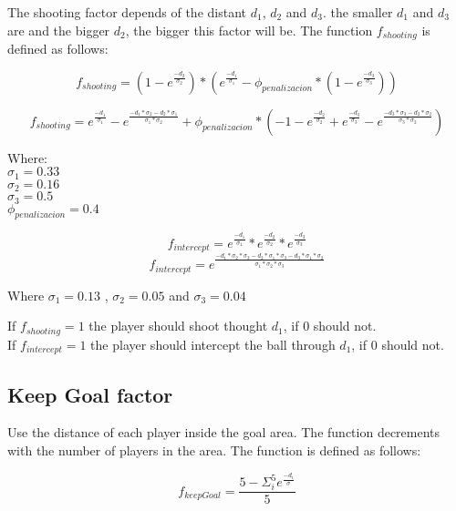 \documentclass[
10pt, %
a4paper, %
oneside, %
headinclude,footinclude, %
BCOR5mm, %
]{scrartcl}
\begin{document}
The shooting factor depends of the distant $d_1$, $d_2$ and $d_3$. the smaller $d_1$ and $d_3$ are and the bigger $d_2$, the bigger this factor will be. The function $f_{shooting}$ is defined as follows:

\begin{equation}	
			f_{shooting} = (1-e^{\frac{-d_2}{\sigma_2}})*(e^{\frac{-d_1}{\sigma_1}} - \phi_{penalizacion} *(1 - e^{\frac{-d_3}{\sigma_3}}))
\end{equation}


\begin{equation} 
	f_{shooting} = e^{\frac{-d_1}{\sigma_1}}- e^{\frac{-d_1*\sigma_2 - d_2*\sigma_1}{\sigma_1*\sigma_2}} + \phi_{penalizacion} * (-1 -e^{\frac{-d_2}{\sigma_2}} + e^{\frac{-d_3}{\sigma_3}} - e^{\frac{-d_3*\sigma_3 - d_2*\sigma_2}{\sigma_3 * \sigma_2}})
\end{equation}

Where:\\
$\sigma_1 = 0.33$\\
$\sigma_2 = 0.16$\\
$\sigma_3 = 0.5$\\
$\phi_{penalizacion} = 0.4$

\begin{equation}
	f_{intercept} = e^{\frac{-d_1}{\sigma_1}} * e^{\frac{-d_2}{\sigma_2}} * e^{\frac{-d_3}{\sigma_3}}
\end{equation}
\begin{equation}
	f_{intercept} = e^{\frac{-d_1*\sigma_2*\sigma_3 -d_2*\sigma_1*\sigma_3 -d_3*\sigma_1*\sigma_2}{\sigma_1*\sigma_2*\sigma_3}}
\end{equation}

Where $\sigma_1 =  0.13$ , $\sigma_2 = 0.05$ and $\sigma_3 = 0.04$


If $f_{shooting} = 1$ the player should shoot thought $d_1$, if $0$ should not.\\
If $f_{intercept} = 1$ the player should intercept the ball  through $d_1$, if $0$ should not. 

\subsection{Keep Goal factor}

Use the distance of each player inside the goal area. The function decrements with the number of players in the area. The function is defined as follows:

\begin{equation}
	f_{keepGoal} = \frac{5 - \Sigma_i^5 e^{\frac{-d_i}{\sigma}}}{5} 
\end{equation}
\end{document}
